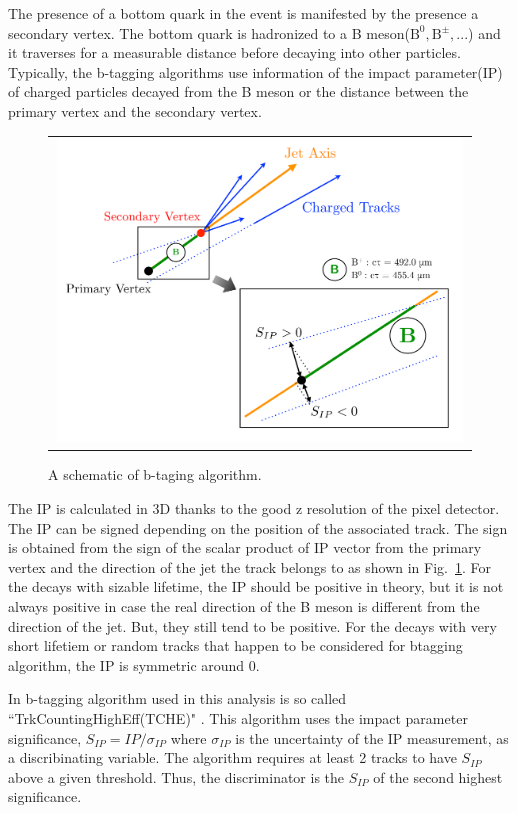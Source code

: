 The presence of a bottom quark in the event is manifested by the presence a secondary vertex. 
The bottom quark is hadronized to a B meson($\textrm{B}^0, \textrm{B}^\pm, ...$) and it 
traverses for a measurable distance before decaying into other particles.
Typically, the b-tagging algorithms use information of the impact parameter(IP) of 
charged particles decayed from the B meson or the distance between the primary vertex 
and the secondary vertex. 
\begin{figure}[htp] 
\centering 
\begin{tabular}{c} 
\includegraphics[width=0.99\textwidth]{figures/Btag.pdf} 
\end{tabular} 
\caption{A schematic of b-taging algorithm.}
\label{fig:btag} 
\end{figure} 
The IP is calculated in 3D thanks to the good z resolution of the 
pixel detector. The IP can be signed depending on the position of 
the associated track. The sign is obtained from the sign of the scalar product of 
IP vector from the primary vertex and the direction of the jet the track belongs to
as shown in Fig.~\ref{fig:btag}.
For the decays with sizable lifetime, the IP should be positive in theory, 
but it is not always positive in case the real direction of the B meson 
is different from the direction of the jet. But, they still tend to be positive. 
For the decays with very short lifetiem or random tracks that happen to be 
considered for btagging algorithm, the IP is symmetric around 0.   

In b-tagging algorithm used in this analysis is so called ``TrkCountingHighEff(TCHE)" \cite{}.
This algorithm uses the impact parameter significance, $S_{IP} = IP / \sigma_{IP}$ 
where $\sigma_{IP}$ is the uncertainty of the IP measurement, 
as a discribinating variable. The algorithm requires at least 2 tracks to have $S_{IP}$ 
above a given threshold. Thus, the discriminator is the $S_{IP}$ of the second highest 
significance. 
